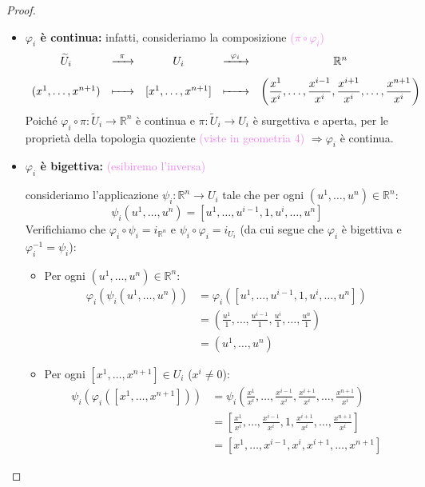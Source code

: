 \begin{proof}
\begin{itemize}
            \item \textbf{$\varphi_i$ è continua:} infatti, consideriamo la composizione \textcolor{violet}{($\pi \circ \varphi_i$)}
            \[
            \begin{array}{ccccc}
            \widetilde{U}_i & \xrightarrow{\;\;\pi\;\;} & U_i & \xrightarrow{\;\;\varphi_i\;\;} & \mathbb{R}^n \\[8pt]
            (x^1, \dots, x^{n+1}) & \xmapsto{\;\;\phantom{\pi}\;\;} & [x^1, \dots, x^{n+1}] & \xmapsto{\;\;\phantom{\varphi_i}\;\;} &
            \left( \dfrac{x^1}{x^i}, \dots, \dfrac{x^{i-1}}{x^i}, \dfrac{x^{i+1}}{x^i}, \dots, \dfrac{x^{n+1}}{x^i} \right)
            \end{array}
            \]
            Poiché $\varphi_i \circ \pi : \tilde{U}_i \to \mathbb{R}^n$ è continua e $\pi : \tilde{U}_i \to U_i$ è surgettiva e aperta, per le proprietà della topologia quoziente
            \textcolor{violet}{(viste in geometria 4)} $\Rightarrow \varphi_i$ è continua.
            
            \item \textbf{$\varphi_i$ è bigettiva:} \textcolor{violet}{(esibiremo l'inversa)}
            
            consideriamo l'applicazione $\psi_i : \mathbb{R}^n \to U_i$ tale che per ogni $(u^1, \dots, u^n) \in \mathbb{R}^n$:
            \[
            \psi_i(u^1, \dots, u^n) = [u^1, \dots, u^{i-1}, 1, u^i, \dots, u^n]
            \]
            Verifichiamo che $\varphi_i \circ \psi_i = i_{\mathbb{R}^n}$ e $\psi_i \circ \varphi_i = i_{U_i}$ 
            \textcolor{blu}{(da cui segue che $\varphi_i$ è bigettiva e $\varphi_i^{-1} = \psi_i$)}:
            \begin{itemize}
                \item Per ogni $(u^1, \dots, u^n) \in \mathbb{R}^n$:
                \begin{align*}
                \varphi_i(\psi_i(u^1, \dots, u^n)) &= \varphi_i([u^1, \dots, u^{i-1}, 1, u^i, \dots, u^n]) \\
                &= \left( \frac{u^1}{1}, \dots, \frac{u^{i-1}}{1}, \frac{u^i}{1}, \dots, \frac{u^n}{1} \right) \\ 
                &= (u^1, \dots, u^n)
                \end{align*}
                \item Per ogni $[x^1, \dots, x^{n+1}] \in U_i$ ($x^i \neq 0$):
                \begin{align*}
                \psi_i(\varphi_i([x^1, \dots, x^{n+1}])) &= \psi_i \left( \frac{x^1}{x^i}, \dots, \frac{x^{i-1}}{x^i}, \frac{x^{i+1}}{x^i}, \dots, \frac{x^{n+1}}{x^i} \right) \\
                &= \left[ \frac{x^1}{x^i}, \dots, \frac{x^{i-1}}{x^i}, 1, \frac{x^{i+1}}{x^i}, \dots, \frac{x^{n+1}}{x^i} \right] \\
                &= [x^1, \dots, x^{i-1}, x^i, x^{i+1}, \dots, x^{n+1}]
                \end{align*}
            \end{itemize}
            

\end{itemize}
\end{proof}
